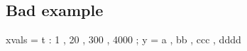 \documentclass{tutodoc}
\begin{document}
%
%
%
%
%
%
%
%
%
%
%
%
\subsection{Bad example \thesubsection}

\begin{functable}
    xvals = t : 1 , 20 , 300 , 4000 ;
    y     = a , bb , ccc , dddd
\end{functable}

%
%


%
%
%
%
\end{document}
